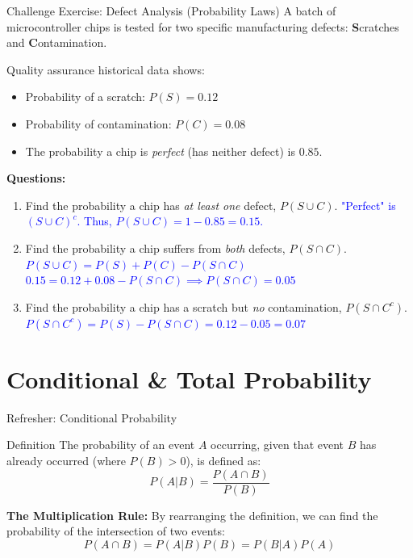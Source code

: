 \documentclass[aspectratio=169]{beamer}
\begin{document}
\begin{frame}{Challenge Exercise: Defect Analysis (Probability Laws)}
    A batch of microcontroller chips is tested for two specific manufacturing defects: \textbf{S}cratches and \textbf{C}ontamination.
    \vspace{0.2cm}

    Quality assurance historical data shows:
    \begin{itemize}
        \item Probability of a scratch: $P(S) = 0.12$
        \item Probability of contamination: $P(C) = 0.08$
        \item The probability a chip is \emph{perfect} (has neither defect) is $0.85$.
    \end{itemize}
    \vspace{0.2cm}

    \textbf{Questions:}
    \begin{enumerate}
        \item Find the probability a chip has \emph{at least one} defect, $P(S \cup C)$. \pause 
        \newline \textcolor{blue}{"Perfect" is $(S \cup C)^c$. Thus, $P(S \cup C) = 1 - 0.85 = 0.15$.} \pause
        
        \item Find the probability a chip suffers from \emph{both} defects, $P(S \cap C)$. \pause 
        \newline \textcolor{blue}{$P(S \cup C) = P(S) + P(C) - P(S \cap C)$}
        \newline \textcolor{blue}{$0.15 = 0.12 + 0.08 - P(S \cap C) \implies P(S \cap C) = 0.05$} \pause
        
        \item Find the probability a chip has a scratch but \emph{no} contamination, $P(S \cap C^c)$. \pause 
        \newline \textcolor{blue}{$P(S \cap C^c) = P(S) - P(S \cap C) = 0.12 - 0.05 = 0.07$}
    \end{enumerate}
\end{frame}

\section{Conditional & Total Probability}

\begin{frame}{Refresher: Conditional Probability}
    \begin{block}{Definition}
        The probability of an event $A$ occurring, given that event $B$ has already occurred (where $P(B) > 0$), is defined as:
        $$ P(A|B) = \frac{P(A \cap B)}{P(B)} $$
    \end{block}
    
    \vspace{0.3cm}
    \textbf{The Multiplication Rule:}
    By rearranging the definition, we can find the probability of the intersection of two events:
    $$ P(A \cap B) = P(A|B)P(B) = P(B|A)P(A) $$
\end{frame}
\end{document}
